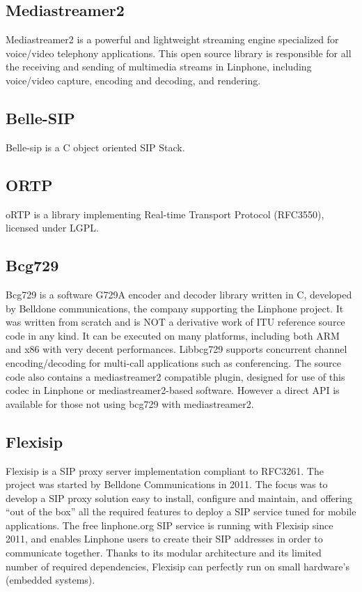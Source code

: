 \documentclass[a4paper]{article}
\begin{document}
\subsection{Mediastreamer2}

Mediastreamer2 is a powerful and lightweight streaming engine specialized for voice/video telephony applications.
This open source library is responsible for all the receiving and sending of multimedia streams in Linphone, including voice/video capture, encoding and decoding, and rendering.

\subsection{Belle-SIP}

Belle-sip is a C object oriented SIP Stack.

\subsection{ORTP}

oRTP is a library implementing Real-time Transport Protocol (RFC3550), licensed under LGPL.

\subsection{Bcg729}

Bcg729 is a software G729A encoder and decoder library written in C, developed by Belldone communications, the company supporting the Linphone project. It was written from scratch and is NOT a derivative work of ITU reference source code in any kind.
It can be executed on many platforms, including both ARM and x86 with very decent performances. Libbcg729 supports concurrent channel encoding/decoding for multi-call applications such as conferencing.
The source code also contains a mediastreamer2 compatible plugin, designed for use of this codec in Linphone or mediastreamer2-based software. However a direct API is available for those not using bcg729 with mediastreamer2.

\subsection{Flexisip}

Flexisip is a SIP proxy server implementation compliant to RFC3261.
The project was started by Belldone Communications in 2011. The focus was to develop a SIP proxy solution easy to install, configure and maintain, and offering “out of the box” all the required features to deploy a SIP service tuned for mobile applications.
The free linphone.org SIP service is running with Flexisip since 2011, and enables Linphone users to create their SIP addresses in order to communicate together.
Thanks to its modular architecture and its limited number of required dependencies, Flexisip can perfectly run on small hardware’s (embedded systems).
\end{document}

